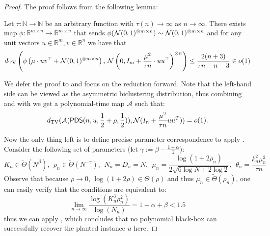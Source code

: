 \documentclass[final,12pt]{colt2023} %
\newcommand\1[1]{\mathbb{I}_{\left\{#1\right\}}}
\begin{document}
\begin{proof}
The proof follows from the following lemma:
\begin{lemma} \label{lem:randrot}
Let $\tau : \mathbb{N} \to \mathbb{N}$ be an arbitrary function with $\tau(n) \to \infty$ as $n \to \infty$. There exists map $\phi : \mathbb{R}^{m \times n} \to \mathbb{R}^{m \times n}$ that sends $\phi(\mathcal{N}(0, 1)^{\otimes m \times n}) \sim \mathcal{N}(0, 1)^{\otimes m \times n}$ and for any unit vectors $u \in \mathbb{R}^m, v \in \mathbb{R}^n$ we have that
$$d_{\rm TV}\left( \phi\left( \mu \cdot uv^\top + \mathcal{N}(0, 1)^{\otimes m \times n} \right),\, \mathcal{N}\left(0, I_m + \frac{\mu^2}{\tau n} \cdot uu^\top\right)^{\otimes n} \right) \le \frac{2(n + 3)}{\tau n - n - 3}\in o(1)$$
\end{lemma}
We defer the proof to \cite{BBH18} and focus on the reduction forward. Note that the left-hand side can be viewed as the asymmetric biclustering distribution, thus combining  and  with  we get a polynomial-time map $\mathcal{A}$ such that:
$$d_{\rm TV}(\mathcal{A}(\mathsf{PDS}(n, u, \frac{1}{2}+\rho, \frac{1}{2})), \mathcal{N}(I_n+\frac{\mu^2}{\tau n}uu^T))=o(1).$$

Now the only thing left is to define precise parameter correspondence to apply . Consider the following set of parameters (let $\gamma:=\beta-\frac{1-\alpha}{2}$):
$$K_n\in\tilde\Theta(N^{\beta}),\;\, \rho_n\in\tilde\Theta(N^{-\gamma}),\;\, N_n=D_n=N,\;\,\mu_n=\frac{\log (1 + 2\rho_n)}{2 \sqrt{6 \log N + 2\log 2}},\;\,\theta_n=\frac{k_n^2\mu_n^2}{\tau n}$$Observe that because $\rho\to 0$, $\log(1+2\rho)\in \Theta(\rho)$ and thus $\mu_n\in\tilde\Theta(\rho_n)$, one can easily verify that the conditions are equivalent to: $$\lim_{n\to\infty}\frac{\log(K_n^3\rho_n^2)}{\log(N_n)}=1-\alpha+\beta<1.5$$thus we can apply , which concludes that no polynomial black-box can successfully recover the planted instance $u$ here. 
\end{proof}
\end{document}
